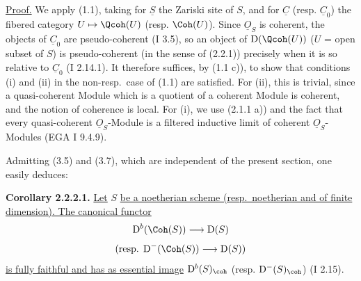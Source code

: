 \uline{Proof.} We apply (1.1), taking for $\underline{S}$ the Zariski site of $S$, and for $\underline{C}$ (resp. $\underline{C}_0$) the fibered category $U\mapsto\Qcoh(U)$ (resp. $\Coh(U)$). Since $\underline{O}_S$ is coherent, the objects of $\underline{C}_0$ are pseudo-coherent (I 3.5), so an object of $\mathrm D(\Qcoh(U))$ ($U$ = open subset of $S$) is pseudo-coherent (in the sense of (2.2.1)) precisely when it is so relative to $\underline{C}_0$ (I 2.14.1). It therefore suffices, by (1.1 c)), to show that conditions (i) and (ii) in the non-resp.\ case of (1.1) are satisfied. For (ii), this is trivial, since a quasi-coherent Module which is a quotient of a coherent Module is coherent, and the notion of coherence is local. For (i), we use (2.1.1 a)) and the fact that every quasi-coherent $\underline{O}_S$-Module is a filtered inductive limit of coherent $\underline{O}_S$-Modules (EGA I 9.4.9).

Admitting (3.5) and (3.7), which are independent of the present section, one easily deduces:

\textbf{Corollary 2.2.2.1.} \uline{Let} $S$ \uline{be a noetherian scheme (resp.\ noetherian and of finite dimension). The canonical functor}
\[
\mathrm D^b(\Coh(S))\longrightarrow\mathrm D(S)
\]
\[
(\text{resp. }\mathrm D^{-}(\Coh(S))\longrightarrow\mathrm D(S))
\]
\uline{is fully faithful and has as essential image} $\mathrm D^b(S)_{\coh}$ (resp. $\mathrm D^{-}(S)_{\coh}$) (I 2.15).


